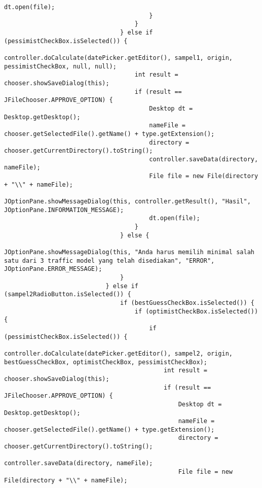 \begin{lstlisting}[caption= main.java]
                                            dt.open(file);
                                        }
                                    }
                                } else if (pessimistCheckBox.isSelected()) {
                                    controller.doCalculate(datePicker.getEditor(), sampel1, origin, pessimistCheckBox, null, null);
                                    int result = chooser.showSaveDialog(this);
                                    if (result == JFileChooser.APPROVE_OPTION) {
                                        Desktop dt = Desktop.getDesktop();
                                        nameFile = chooser.getSelectedFile().getName() + type.getExtension();
                                        directory = chooser.getCurrentDirectory().toString();
                                        controller.saveData(directory, nameFile);
                                        File file = new File(directory + "\\" + nameFile);
                                        JOptionPane.showMessageDialog(this, controller.getResult(), "Hasil", JOptionPane.INFORMATION_MESSAGE);
                                        dt.open(file);
                                    }
                                } else {
                                    JOptionPane.showMessageDialog(this, "Anda harus memilih minimal salah satu dari 3 traffic model yang telah disediakan", "ERROR", JOptionPane.ERROR_MESSAGE);
                                }
                            } else if (sampel2RadioButton.isSelected()) {
                                if (bestGuessCheckBox.isSelected()) {
                                    if (optimistCheckBox.isSelected()) {
                                        if (pessimistCheckBox.isSelected()) {
                                            controller.doCalculate(datePicker.getEditor(), sampel2, origin, bestGuessCheckBox, optimistCheckBox, pessimistCheckBox);
                                            int result = chooser.showSaveDialog(this);
                                            if (result == JFileChooser.APPROVE_OPTION) {
                                                Desktop dt = Desktop.getDesktop();
                                                nameFile = chooser.getSelectedFile().getName() + type.getExtension();
                                                directory = chooser.getCurrentDirectory().toString();
                                                controller.saveData(directory, nameFile);
                                                File file = new File(directory + "\\" + nameFile);

\end{lstlisting}
